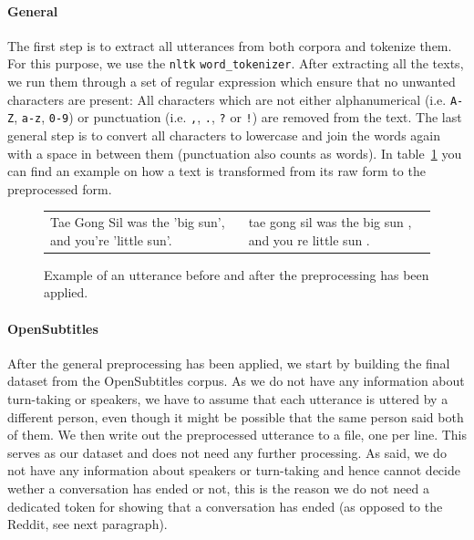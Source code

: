 \paragraph{General} The first step is to extract all utterances from both corpora and tokenize them. For this purpose, we use the \texttt{nltk} \texttt{word\_tokenizer}. After extracting all the texts, we run them through a set of regular expression which ensure that no unwanted characters are present: All characters which are not either alphanumerical (i.e. \texttt{A-Z}, \texttt{a-z}, \texttt{0-9}) or punctuation (i.e. \texttt{,}, \texttt{.}, \texttt{?} or \texttt{!}) are removed from the text. The last general step is to convert all characters to lowercase and join the words again with a space in between them (punctuation also counts as words). In table~\ref{data:preprocessing:table_after_preprocessing} you can find an example on how a text is transformed from its raw form to the preprocessed form.
\\
\begin{figure}[h]
	\centering
	\begin{adjustbox}{max width=\textwidth}
		\begin{tabular}{ll}
			\toprule
			\specialcell{Raw Utterance} & \specialcell{Preprocessed Utterance}\\
			\midrule
			Tae Gong Sil was the 'big sun', and you're 'little sun'. & tae gong sil was the big sun , and you re little sun . \\
			\bottomrule
		\end{tabular}
	\end{adjustbox}
	\caption{Example of an utterance before and after the preprocessing has been applied.}
	\label{data:preprocessing:table_after_preprocessing}
\end{figure}

\paragraph{OpenSubtitles} After the general preprocessing has been applied, we start by building the final dataset from the OpenSubtitles corpus. As we do not have any information about turn-taking or speakers, we have to assume that each utterance is uttered by a different person, even though it might be possible that the same person said both of them. We then write out the preprocessed utterance to a file, one per line. This serves as our dataset and does not need any further processing. As said, we do not have any information about speakers or turn-taking and hence cannot decide wether a conversation has ended or not, this is the reason we do not need a dedicated token for showing that a conversation has ended (as opposed to the Reddit, see next paragraph).

